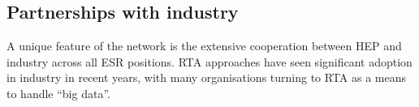 \subsection{Partnerships with industry}
\label{sec-2}
A unique feature of the network is the extensive cooperation between HEP and industry across all ESR positions. RTA approaches have seen significant adoption in industry in recent years, with many organisations turning to RTA as a means to handle ``big data''.